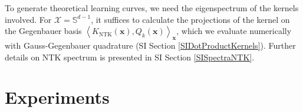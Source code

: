 \documentclass{article}
\newcommand{\cp}[1]{{\color{red} #1}}
\begin{document}

To generate theoretical learning curves, we need the eigenspectrum of the kernels involved. For $\mathcal{X}=\mathbb{S}^{d-1}$, it suffices to calculate the projections of the kernel on the Gegenbauer basis $\left < K_{\text{NTK}}(\mathbf{x}),Q_k(\mathbf{x}) \right>_{\mathbf{x}}$, which we evaluate numerically with Gauss-Gegenbauer quadrature (SI Section \ref{SIDotProductKernels}). Further details on NTK spectrum is presented in SI Section \ref{SISpectraNTK}. 















\section{Experiments}
\end{document}
